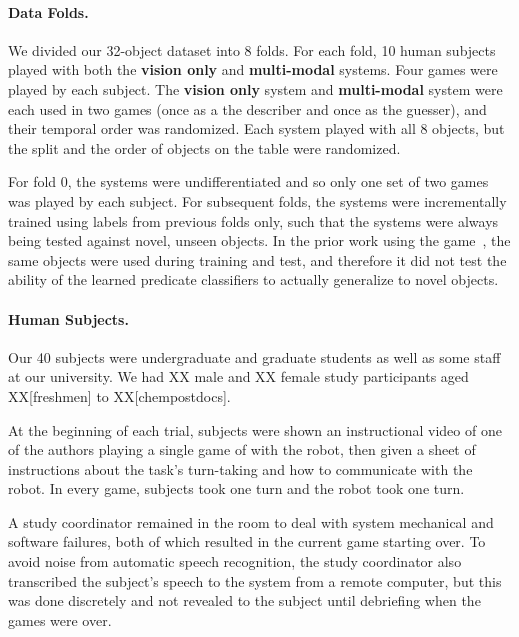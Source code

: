 \paragraph{Data Folds.}
We divided our 32-object dataset into 8 folds.  For each fold, 10 human
subjects played \ispy with both the \textbf{vision only} and
\textbf{multi-modal} systems.  Four games were played by each subject.  The
\textbf{vision only} system and \textbf{multi-modal} system were each used in
two games (once as a the describer and once as the guesser), and their temporal
order was randomized.  Each system played with all 8 objects, but the split and
the order of objects on the table were randomized.

For fold 0, the systems were undifferentiated and so only one set of two games
was played by each subject.  For subsequent folds, the systems were
incrementally trained using labels from previous folds only, such that the
systems were always being tested against novel, unseen objects.  In the prior
work using the \ispy game~\cite{parde:ijcai15}, the same objects were used
during training and test, and therefore it did not test the ability of the
learned predicate classifiers to actually generalize to novel objects.

\paragraph{Human Subjects.}

Our 40 subjects were undergraduate and graduate students as well as some staff
at our university.  We had XX male and XX female study participants aged
XX[freshmen] to XX[chempostdocs].

At the beginning of each trial, subjects were shown an instructional video of
one of the authors playing a single game of \ispy with the robot, then given a
sheet of instructions about the task's turn-taking and how to communicate with
the robot.  In every game, subjects took one turn and the robot took one turn.

A study coordinator remained in the room to deal with system mechanical and
software failures, both of which resulted in the current game starting over.
To avoid noise from automatic speech recognition, the study coordinator also
transcribed the subject's speech to the system from a remote computer, but this
was done discretely and not revealed to the subject until debriefing when the
games were over.
